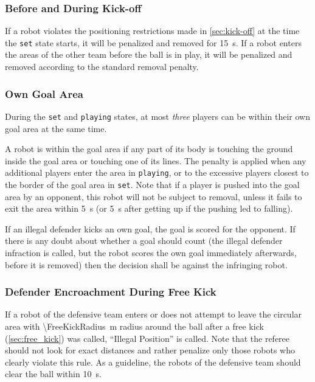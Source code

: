\subsubsection{Before and During Kick-off}
\label{sec:ip_kick_off}

If a robot violates the positioning restrictions made in \cref{sec:kick-off} at the time the \texttt{set} state starts, it will be penalized and removed for \qty{15}{\second}.
If a robot enters the areas of the other team before the ball is in play, it will be penalized and removed according to the standard removal penalty.

\subsubsection{Own Goal Area}
\label{sec:ip_own_goal_area}

During the \texttt{set} and \texttt{playing} states, at most \textit{three} players can be within their own goal area at the same time.

A robot is within the goal area if any part of its body is touching the ground inside the goal area or touching one of its lines.
The penalty is applied when any additional players enter the area in \texttt{playing}, or to the excessive players closest to the border of the goal area in \texttt{set}.
Note that if a player is pushed into the goal area by an opponent, this robot will not be subject to removal, unless it fails to exit the area within \qty{5}{\second} (or \qty{5}{\second} after getting up if the pushing led to falling).

If an illegal defender kicks an own goal, the goal is scored for the opponent.
If there is any doubt about whether a goal should count (\eg the illegal defender infraction is called, but the robot scores the own goal immediately afterwards, before it is removed) then the decision shall be against the infringing robot.

\subsubsection{Defender Encroachment During Free Kick}
\label{sec:ip_free_kick}

If a robot of the defensive team enters or does not attempt to leave the circular area with \qty{\FreeKickRadius}{\metre} radius around the ball after a free kick (\cf \cref{sec:free_kick}) was called, ``Illegal Position'' is called.
Note that the referee should not look for exact distances and rather penalize only those robots who clearly violate this rule.
As a guideline, the robots of the defensive team should clear the ball within \qty{10}{\second}.

